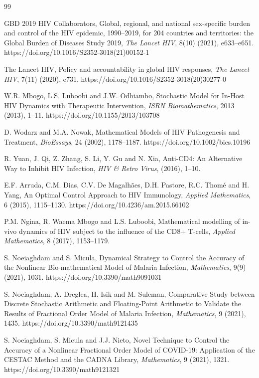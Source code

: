 \documentclass{article}
\theoremstyle{plain}
\theoremstyle{definition}
\numberwithin{equation}{section}
\begin{document}
\begin{thebibliography}{99}


GBD 2019 HIV Collaborators,
Global, regional, and national sex-specific burden and control of the HIV epidemic, 1990--2019, for 204 countries and territories: the Global Burden of Diseases Study 2019,
\textit{The Lancet HIV}, 8(10) (2021), e633--e651.
https://doi.org/10.1016/S2352-3018(21)00152-1

The Lancet HIV,
Policy and accountability in global HIV responses,
\textit{The Lancet HIV}, 7(11) (2020), e731.
https://doi.org/10.1016/S2352-3018(20)30277-0

W.R. Mbogo, L.S. Luboobi and J.W. Odhiambo,
Stochastic Model for In-Host HIV Dynamics with Therapeutic Intervention,
\textit{ISRN Biomathematics}, 2013 (2013), 1--11.
https://doi.org/10.1155/2013/103708

D. Wodarz and M.A. Nowak,
Mathematical Models of HIV Pathogenesis and Treatment,
\textit{BioEssays}, 24 (2002), 1178--1187.
https://doi.org/10.1002/bies.10196

R. Yuan, J. Qi, Z. Zhang, S. Li, Y. Gu and N. Xia,
Anti-CD4: An Alternative Way to Inhibit HIV Infection,
\textit{HIV \& Retro Virus}, (2016), 1--10.

E.F. Arruda, C.M. Dias, C.V. De Magalhães, D.H. Pastore, R.C. Thomé and H. Yang,
An Optimal Control Approach to HIV Immunology,
\textit{Applied Mathematics}, 6 (2015), 1115--1130.
https://doi.org/10.4236/am.2015.66102

P.M. Ngina, R. Waema Mbogo and L.S. Luboobi,
Mathematical modelling of in-vivo dynamics of HIV subject to the influence of the CD8+ T-cells,
\textit{Applied Mathematics}, 8 (2017), 1153--1179.

S. Noeiaghdam and S. Micula,
Dynamical Strategy to Control the Accuracy of the Nonlinear Bio-mathematical Model of Malaria Infection,
\textit{Mathematics}, 9(9) (2021), 1031.
https://doi.org/10.3390/math9091031

S. Noeiaghdam, A. Dreglea, H. Isik and M. Suleman,
Comparative Study between Discrete Stochastic Arithmetic and Floating-Point Arithmetic to Validate the Results of Fractional Order Model of Malaria Infection,
\textit{Mathematics}, 9 (2021), 1435.
https://doi.org/10.3390/math9121435

S. Noeiaghdam, S. Micula and J.J. Nieto,
Novel Technique to Control the Accuracy of a Nonlinear Fractional Order Model of COVID-19: Application of the CESTAC Method and the CADNA Library,
\textit{Mathematics}, 9 (2021), 1321.
https://doi.org/10.3390/math9121321


\end{thebibliography}
\end{document}
